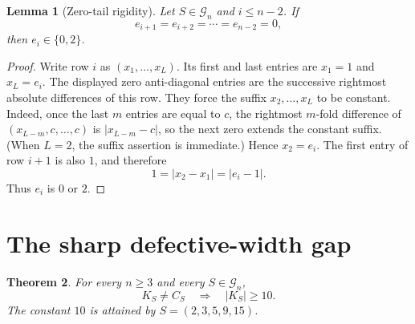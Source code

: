 \documentclass[11pt]{article}
\newtheorem{theorem}{Theorem}
\newtheorem{lemma}[theorem]{Lemma}
\theoremstyle{remark}
\newcommand{\G}{\mathcal G}
\begin{document}
\begin{lemma}[Zero-tail rigidity]\label{lem:zero-tail}
Let $S\in\G_n$ and $i\le n-2$.  If
\[
 e_{i+1}=e_{i+2}=\cdots=e_{n-2}=0,
\]
then $e_i\in\{0,2\}$.
\end{lemma}

\begin{proof}
Write row $i$ as $(x_1,\ldots,x_L)$.  Its first and last entries are
$x_1=1$ and $x_L=e_i$.  The displayed zero anti-diagonal entries are the
successive rightmost absolute differences of this row.  They force the
suffix $x_2,\ldots,x_L$ to be constant.  Indeed, once the last $m$ entries
are equal to $c$, the rightmost $m$-fold difference of
$(x_{L-m},c,\ldots,c)$ is $|x_{L-m}-c|$, so the next zero extends the
constant suffix.  (When $L=2$, the suffix assertion is immediate.)
Hence $x_2=e_i$.  The first entry of row $i+1$ is also $1$, and therefore
\[
 1=|x_2-x_1|=|e_i-1|.
\]
Thus $e_i$ is $0$ or $2$.
\end{proof}

\section{The sharp defective-width gap}

\begin{theorem}\label{thm:gap}
For every $n\ge3$ and every $S\in\G_n$,
\[
 K_S\ne C_S\quad\Longrightarrow\quad |K_S|\ge10.
\]
The constant $10$ is attained by $S=(2,3,5,9,15)$.
\end{theorem}
\end{document}
